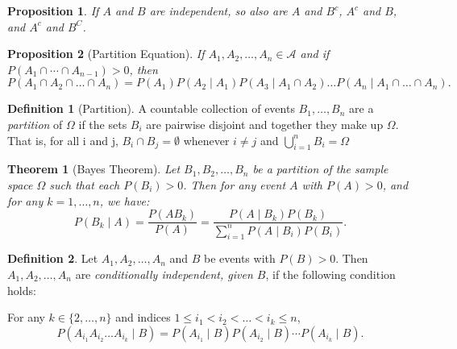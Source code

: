 \documentclass{article}
\newtheorem{theorem}{Theorem}[section]
\newtheorem{proposition}{Proposition}[section]
\theoremstyle{definition}
\newtheorem{definition}{Definition}[section]
\theoremstyle{remark}
\begin{document}
\begin{proposition}
If $A$ and $B$ are independent, so also are $A$ and $B^c$, $A^c$ and $B$, and $A^c$ and $B^C$. 
\end{proposition}



\begin{proposition}[Partition Equation]\label{prop:partition equation}
If \(A_1, A_2, \dots, A_n \in \mathcal{A}\) and if $ P(A_1 \cap \cdots \cap A_{n-1}) > 0$, then  
\[
P(A_1 \cap A_2 \cap \dots \cap A_n) = P(A_1)P(A_2 \mid A_1)P(A_3 \mid A_1 \cap A_2) \dots P(A_n \mid A_1 \cap \dots \cap A_n).
\]
\end{proposition}



\begin{definition}[Partition]\label{def:partition}
A countable collection of events \(B_1, \dots, B_n\) are a \textit{partition} of \(\Omega\) 
if the sets \(B_i\) are pairwise disjoint and together they make up \(\Omega\). 
That is, for all i and j, \( B_i \cap B_j = \emptyset \) whenever \(i \neq j\) 
and \( \bigcup_{i=1}^n B_i = \Omega\)
\end{definition}







\begin{theorem}[Bayes Theorem]\label{thm:bayes_formula}
Let \( B_1, B_2, \dots, B_n \) be a partition of the sample space \( \Omega \) such that each \( P(B_i) > 0 \). Then for any event \( A \) with \( P(A) > 0 \), and for any \( k = 1, \dots, n \), we have:
\[
P(B_k \mid A) = \frac{P(A B_k)}{P(A)} = \frac{P(A \mid B_k) P(B_k)}{\sum_{i=1}^{n} P(A \mid B_i) P(B_i)}.
\]
\end{theorem}









\begin{definition}\label{def:conditional_independence}
Let \( A_1, A_2, \dots, A_n \) and \( B \) be events with \( P(B) > 0 \). Then \( A_1, A_2, \dots, A_n \) are \textit{conditionally independent, given \( B \)}, if the following condition holds:

For any \( k \in \{2, \dots, n\} \) and indices \( 1 \leq i_1 < i_2 < \dots < i_k \leq n \),
\[
P(A_{i_1} A_{i_2} \dots A_{i_k} \mid B) = P(A_{i_1} \mid B) P(A_{i_2} \mid B) \cdots P(A_{i_k} \mid B).
\]
\end{definition}
\end{document}
